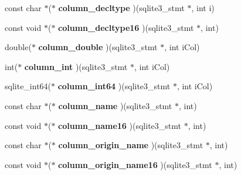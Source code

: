 \begin{DoxyCompactItemize}
const char $\ast$($\ast$ {\bfseries column\+\_\+decltype} )(sqlite3\+\_\+stmt $\ast$, int i)
\item 
\mbox{\label{structsqlite3__api__routines_aa0c2e3c8ba3face8a9ca7825fa2abac1}} 
const void $\ast$($\ast$ {\bfseries column\+\_\+decltype16} )(sqlite3\+\_\+stmt $\ast$, int)
\item 
\mbox{\label{structsqlite3__api__routines_afd21003df28cb46354c00599b90e6de5}} 
double($\ast$ {\bfseries column\+\_\+double} )(sqlite3\+\_\+stmt $\ast$, int i\+Col)
\item 
\mbox{\label{structsqlite3__api__routines_a6211d95cf114f26cb48eed02d3b5eb70}} 
int($\ast$ {\bfseries column\+\_\+int} )(sqlite3\+\_\+stmt $\ast$, int i\+Col)
\item 
\mbox{\label{structsqlite3__api__routines_a523a8d125fe83c9ea45eb4057a4d2458}} 
sqlite\+\_\+int64($\ast$ {\bfseries column\+\_\+int64} )(sqlite3\+\_\+stmt $\ast$, int i\+Col)
\item 
\mbox{\label{structsqlite3__api__routines_ab01499e4ca8ec6db92f34f8274041ae5}} 
const char $\ast$($\ast$ {\bfseries column\+\_\+name} )(sqlite3\+\_\+stmt $\ast$, int)
\item 
\mbox{\label{structsqlite3__api__routines_a4ca83aec1d4cfe474f1afa0bcdde0e20}} 
const void $\ast$($\ast$ {\bfseries column\+\_\+name16} )(sqlite3\+\_\+stmt $\ast$, int)
\item 
\mbox{\label{structsqlite3__api__routines_a18cb726aaf966e6d4a6954cb3c716991}} 
const char $\ast$($\ast$ {\bfseries column\+\_\+origin\+\_\+name} )(sqlite3\+\_\+stmt $\ast$, int)
\item 
\mbox{\label{structsqlite3__api__routines_ae5022cdbd16222eaf08d5fdba9292142}} 
const void $\ast$($\ast$ {\bfseries column\+\_\+origin\+\_\+name16} )(sqlite3\+\_\+stmt $\ast$, int)
\item 
\mbox{\label{structsqlite3__api__routines_a66cc9e4b3cb918a699f3386df76ed1bc}} 

\end{DoxyCompactItemize}
